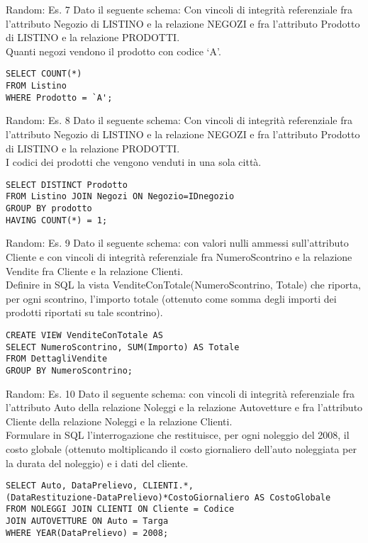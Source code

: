 %
\begin{frame}[fragile]{Random: Es. 7}
Dato il seguente schema:
\schemaNegoziProdottiListino
Con vincoli di integrit\`a referenziale fra l'attributo Negozio di LISTINO e la relazione NEGOZI e fra l'attributo Prodotto di LISTINO e la relazione PRODOTTI.
\newline
\\Quanti negozi vendono il prodotto con codice `A'.
\pause
\begin{lstlisting}
SELECT COUNT(*)
FROM Listino
WHERE Prodotto = `A';
\end{lstlisting}
\end{frame}
%
\begin{frame}[fragile]{Random: Es. 8}
Dato il seguente schema:
\schemaNegoziProdottiListino
Con vincoli di integrit\`a referenziale fra l'attributo Negozio di LISTINO e la relazione NEGOZI e fra l'attributo Prodotto di LISTINO e la relazione PRODOTTI.
\newline
\\I codici dei prodotti che vengono venduti in una sola citt\`a.
\pause
\begin{lstlisting}
SELECT DISTINCT Prodotto
FROM Listino JOIN Negozi ON Negozio=IDnegozio
GROUP BY prodotto
HAVING COUNT(*) = 1;
\end{lstlisting}
\end{frame}
%
\begin{frame}[fragile]{Random: Es. 9}
Dato il seguente schema:
\schemaVenditeClientiDettagliVendite
con valori nulli ammessi sull'attributo Cliente e con vincoli di integrit\`a referenziale fra NumeroScontrino e la relazione Vendite fra Cliente e la relazione Clienti.
\newline
\\Definire in SQL la vista VenditeConTotale(NumeroScontrino, Totale) che riporta, per ogni scontrino, l'importo totale (ottenuto come somma degli importi dei prodotti riportati su tale scontrino).
\pause
\begin{lstlisting}
CREATE VIEW VenditeConTotale AS
SELECT NumeroScontrino, SUM(Importo) AS Totale
FROM DettagliVendite
GROUP BY NumeroScontrino;
\end{lstlisting}
\end{frame}
%
\begin{frame}[fragile]{Random: Es. 10}
Dato il seguente schema:
\schemaClientiNoleggiAuto
con vincoli di integrit\`a referenziale fra l'attributo Auto della relazione Noleggi e la relazione Autovetture e fra l'attributo Cliente della relazione Noleggi e la relazione Clienti.
\newline
\\Formulare in SQL l'interrogazione che restituisce, per ogni noleggio del 2008, il costo globale (ottenuto moltiplicando il costo giornaliero dell'auto noleggiata per la durata del noleggio) e i dati del cliente.
\pause
\begin{lstlisting}
SELECT Auto, DataPrelievo, CLIENTI.*, 
(DataRestituzione-DataPrelievo)*CostoGiornaliero AS CostoGlobale
FROM NOLEGGI JOIN CLIENTI ON Cliente = Codice
JOIN AUTOVETTURE ON Auto = Targa
WHERE YEAR(DataPrelievo) = 2008;    
\end{lstlisting}
\end{frame}
